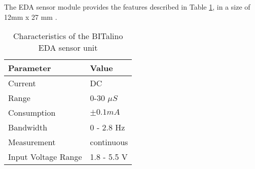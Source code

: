 The EDA sensor module provides the features described in Table \ref{toc:bitalino-features}, in a size of 12mm x 27 mm \cite{bitalino-general}.

\begin{table}[H]
\centering
\begin{tabular}{ll}
    \hline
    Parameter               & Value \\
    \hline
    Current                 & DC \\
    Range                   & 0-30 $\mu S$ \\
    Consumption             & $\pm 0.1 mA$ \\
    Bandwidth               & 0 - 2.8 Hz \\
    Measurement             & continuous \\
    Input Voltage Range     & 1.8 - 5.5 V \\
    \hline
\end{tabular}
\caption{Characteristics of the BITalino EDA sensor unit}
\label{toc:bitalino-features}
\end{table}






